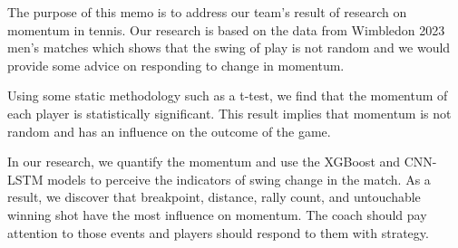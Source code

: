 \documentclass[12pt]{article}
\begin{document}
\vspace{\baselineskip}
\quad The purpose of this memo is to address our team's result of research on momentum in tennis. Our research is based on the data from Wimbledon 2023 men’s matches which shows that the swing of play is not random and we would provide some advice on responding to change in momentum. 

Using some static methodology such as a t-test, we find that the momentum of each player is statistically significant. This result implies that momentum is not random and has an influence on the outcome of the game. 

In our research, we quantify the momentum and use the XGBoost and CNN-LSTM models to perceive the indicators of swing change in the match. As a result, we discover that breakpoint, distance, rally count, and untouchable winning shot have the most influence on momentum. The coach should pay attention to those events and players should respond to them with strategy. 
\end{document}
